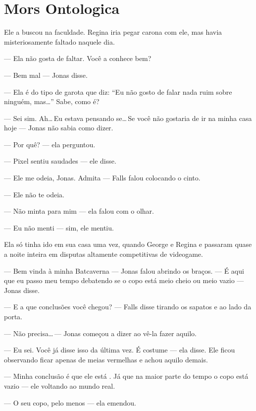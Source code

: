 \chapter{Mors Ontologica}

Ele a buscou na faculdade. Regina iria pegar carona com ele, mas havia misteriosamente faltado naquele dia.

--- Ela não gosta de faltar. Você a conhece bem?

--- Bem mal --- Jonas disse.

--- Ela é do tipo de garota que diz: ``Eu não gosto de falar nada ruim sobre ninguém, mas\ldots'' Sabe, como é?

--- Sei\mudanca{,} sim. Ah\ldots\,Eu estava pensando se\ldots\,Se você não gostaria de ir na minha casa hoje --- Jonas não sabia como dizer.

--- Por quê? --- ela perguntou.

--- Pixel sentiu saudades --- ele disse.

--- Ele me odeia, Jonas. Admita ---  Falls falou\mudanca{,} colocando o cinto.

--- Ele não te odeia.

--- Não minta para mim --- ela falou\mudanca{,}  com o olhar.

--- Eu não menti --- sim, ele mentiu.

Ela só tinha ido em sua casa uma vez, quando George e Regina  e passaram quase a noite inteira em disputas altamente competitivas de videogame.

--- Bem vinda à minha Batcaverna --- Jonas falou abrindo os braços. ---  É aqui que eu passo meu tempo debatendo se o copo está meio cheio ou meio vazio ---  Jonas disse.

---  E a que conclusões você chegou? ---  Falls disse\mudanca{,} tirando os sapatos e  ao lado da porta.

---  Não precisa\ldots\,--- Jonas começou a dizer\mudanca{,} ao vê-la fazer aquilo.

--- Eu sei. Você já disse isso da última vez. É costume --- ela disse. Ele ficou observando  ficar apenas de meias vermelhas e achou aquilo demais.

--- Minha conclusão é que ele está . Já que\mudanca{,} na maior parte do tempo\mudanca{,} o copo está vazio --- ele  voltando ao mundo real.

--- O seu copo, pelo menos --- ela emendou.

